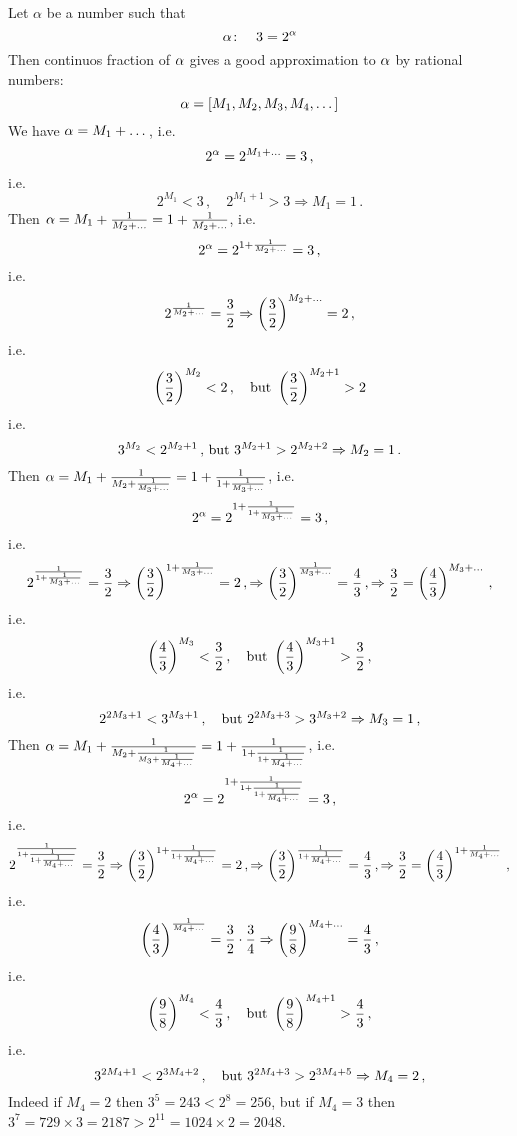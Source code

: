 Let $\alpha$ be a number such that
      $$
  \alpha\colon\quad  3=2^\alpha     
      $$
Then continuos fraction  of $\alpha$ gives a good approximation
to $\alpha$ by rational numbers:
    $$
\alpha=[M_1,M_2,M_3,M_4,\dots]
    $$
We have $\alpha=M_1+\dots$, i.e.
        $$
    2^\alpha=2^{M_1+\dots}=3\,,
        $$
i.e.
        $$
     2^{M_1}<3\,,\quad 2^{M_1+1}>3\Rightarrow M_1=1\,.
        $$
Then $\alpha=M_1+{1\over M_2+\dots}=1+{1\over M_2+\dots}$, i.e.
        $$
    2^\alpha=2^{1+{1\over M_2+\dots}}=3\,,
        $$
i.e.
          $$
    2^{{1\over M_2+\dots}}={3\over 2}\Rightarrow
      \left({3\over 2}\right)^{M_2+\dots}=2\,,
          $$
i.e.
        $$
      \left(3\over 2\right)^{M_2}<2\,,\quad {\rm but}\,\,
\left(3\over 2\right)^{M_2+1}>2
        $$
i.e.
        $$
    3^{M_2}<2^{M_2+1}\,,\,{\rm but}\,\,
      3^{M_2+1}>2^{M_2+2}\Rightarrow M_2=1\,.
         $$
Then $\alpha=M_1+{1\over M_2+{1\over M_3+\dots}}=
         1+{1\over 1+{1\over M_3+\dots}}$, i.e.
        $$
    2^\alpha=2^{1+{1\over 1+{1\over M_3+\dots}}}=3\,,
        $$
i.e.
          $$
    2^{{1\over 1+{1\over M_3+\dots}}}={3\over 2}
            \Rightarrow
      \left(3\over 2\right)^{1+{1\over M_3+\dots}}=2\,,
            \Rightarrow
      \left(3\over 2\right)^{{1\over M_3+\dots}}={4\over 3}\,,
            \Rightarrow
      {3\over 2}=\left(4\over 3\right)^{M_3+\dots}\,,
          $$
i.e.
        $$
      \left({4\over 3}\right)^{M_3}<{3\over 2}\,,
     \quad {\rm but}\,\,
      \left({4\over 3}\right)^{M_3+1}>{3\over 2}\,,
        $$
i.e.
        $$
    2^{2M_3+1}<3^{M_3+1}\,,
   \quad {\rm but}\,\,
    2^{2M_3+3}>3^{M_3+2}\Rightarrow M_3=1\,,
         $$
Then
 $\alpha=M_1+{1\over M_2+{1\over M_3+{1\over M_4+\dots}}}=
       1+{1\over 1+{1\over 1+{1\over M_4+\dots}}}  $, i.e.
        $$
    2^\alpha=2^{1+{1\over 1+{1\over 1+{1\over M_4+\dots}}}}=3\,,
        $$
i.e.
          $$
    2^{{1\over 1+{1\over 1+{1\over M_4+\dots}}}}={3\over 2}
            \Rightarrow
      \left(3\over 2\right)^{1+{1\over 1+{1\over M_4+\dots}}}=2\,,
            \Rightarrow
      \left(3\over 2\right)^{{1\over 1+{1\over M_4+\dots}}}={4\over 3}\,,
            \Rightarrow
      {3\over 2}=\left(4\over 3\right)^{1+{1\over M_4+\dots}}\,,
          $$
i.e.
           $$
        \left(4\over 3\right)^{1\over M_4+\dots}=
         {3\over 2}\cdot {3\over 4}
          \Rightarrow
         \left(9\over 8\right)^{M_4+\dots}={4\over 3}\,,
           $$
i.e.
        $$
      \left({9\over 8}\right)^{M_4}<{4\over 3}\,,
     \quad {\rm but}\,\,
      \left({9\over 8}\right)^{M_4+1}>{4\over 3}\,,
        $$
i.e.
        $$
    3^{2M_4+1}<2^{3M_4+2}\,,
   \quad {\rm but}\,\,
    3^{2M_4+3}>2^{3M_4+5}\Rightarrow M_4=2\,,
         $$
Indeed if $M_4=2$ then $3^5=243<2^8=256$, but
if  $M_4=3$ then $3^7=729\times 3=2187>2^11=1024\times 2=2048$. 

